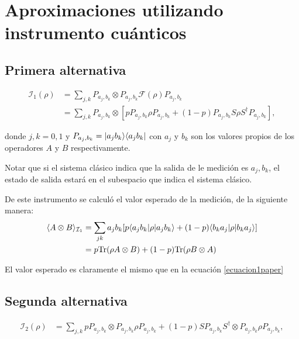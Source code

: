 \documentclass[12pt,oneside]{book}\raggedbottom{}
\begin{document}
\section{Aproximaciones utilizando instrumento cuánticos}

\subsection{Primera alternativa}

 \begin{equation}
    \begin{split}
        \mathcal{I}_1(\rho)&=\sum_{j,k}P_{a_j,b_k}\otimes P_{a_j,b_k} \mathcal{F}(\rho) P_{a_j,b_k}\\
        &=\sum_{j,k}P_{a_j,b_k}\otimes[p P_{a_j,b_k}\rho P_{a_j,b_k}+(1-p)P_{a_j,b_k}S\rho S^\dagger P_{a_j,b_k}],
\end{split}
\end{equation}

donde $j,k=0,1$ y $P_{a_j,b_k}=|a_j b_k\rangle \langle a_j b_k|$ con $a_j$ y $b_k$ son los valores propios de los operadores $A$ y $B$ respectivamente.


Notar que si el sistema clásico indica que la salida de le medición es $a_j,b_k$, el estado de salida estará en el subespacio que indica el sistema clásico.

De este instrumento se calculó el  valor esperado de la medición, de la siguiente manera:\begin{equation*}
	\begin{split}
	\langle A\otimes B \rangle_{\mathcal{I}_1}&=\sum_{jk} a_{j}b_k[p\langle a_j b_k|\rho |a_j b_k\rangle + (1-p)\langle b_k a_j|\rho | b_k a_j\rangle] \\
   & = p{\rm Tr}(\rho A\otimes B)+(1-p){\rm Tr}(\rho B\otimes A)\\
\end{split}\end{equation*}


El valor esperado es claramente el mismo que en la ecuación {\ref{ecuacion1paper}}
\subsection{Segunda alternativa}

\begin{equation}
    \begin{split}
        \mathcal{I}_2(\rho)&=\sum_{j,k} pP_{a_j,b_k} \otimes P_{a_j,b_k} \rho P_{a_j,b_k}+(1-p)SP_{a_j,b_k}S^\dagger\otimes P_{a_j,b_k} \rho P_{a_j,b_k},\\
    \end{split}
\end{equation} 
\end{document}
